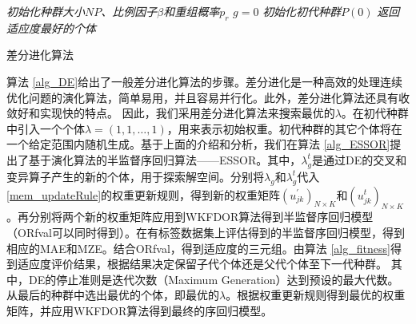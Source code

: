 \IncMargin{1em}
\begin{algorithm}
\emph{初始化种群大小$NP$、比例因子$\beta$和重组概率$p_{r}$}\;
\emph{$g=0$}\;
\emph{初始化初代种群$P(0)$}\;
\emph{返回适应度最好的个体}\;
\caption{差分进化算法}\label{alg_DE}
\end{algorithm}\DecMargin{1em}

算法 \ref{alg_DE}给出了一般差分进化算法的步骤。差分进化是一种高效的处理连续优化问题的演化算法，简单易用，并且容易并行化\citep{storn1997differential}。此外，差分进化算法还具有收敛好和实现快的特点\citep{price2006differential}。
因此，我们采用差分进化算法来搜索最优的\(\lambda\)。在初代种群中引入一个个体\(\lambda=(1,1,\dots,1)\)，用来表示初始权重。初代种群的其它个体将在一个给定范围内随机生成。基于上面的介绍和分析，我们在算法 \ref{alg_ESSOR}提出了基于演化算法的半监督序回归算法——ESSOR。其中，\(\lambda_{g}^{t}\)是通过DE的交叉和变异算子产生的新的个体，用于探索解空间。分别将\(\lambda_{g}\)和\(\lambda_g^{t}\)代入\autoref{mem_updateRule}的权重更新规则，得到新的权重矩阵\((u_{jk}^{'})_{N \times K}\)和\((u_{jk}^{t})_{N \times K}\)。再分别将两个新的权重矩阵应用到WKFDOR算法得到半监督序回归模型（ORfval可以同时得到）。在有标签数据集上评估得到的半监督序回归模型，得到相应的MAE和MZE。结合ORfval，得到适应度的三元组。由算法 \ref{alg_fitness}得到适应度评价结果，根据结果决定保留子代个体还是父代个体至下一代种群。
其中，DE的停止准则是迭代次数（Maximum Generation）达到预设的最大代数。从最后的种群中选出最优的个体，即最优的\(\lambda\)。根据权重更新规则得到最优的权重矩阵，并应用WKFDOR算法得到最终的序回归模型。


